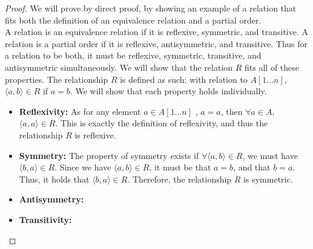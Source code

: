 \documentclass[titlepage]{article}
\begin{document}
\begin{proof}
We will prove by direct proof, by showing an example of a relation that fits both the definition of an equivalence relation and a partial order.
\\
A relation is an equivalence relation if it is reflexive, symmetric, and transitive. A relation is a partial order if it is reflexive, antisymmetric, and transitive. Thus for a relation to be both, it must be reflexive, symmetric, transitive, and antisymmetric simultaneously. We will show that the relation $R$ fits all of these properties. The relationship $R$ is defined as such: with relation to $A[1...n]$, $\langle a,b \rangle \in R$ if $a=b$. We will show that each property holds individually.
\begin{itemize}
\item \textbf{Reflexivity:} As for any element $a \in A[1...n]$ , $a=a$, then $\forall a \in A$, $\langle a,a \rangle \in R$. This is exactly the definition of reflexivity, and thus the relationship $R$ is reflexive.
\item \textbf{Symmetry:} The property of symmetry exists if $\forall \langle a,b \rangle \in R$, we must have $\langle b,a \rangle \in R$. Since we have $\langle a,b \rangle \in R$, it must be that $a=b$, and that $b=a$. Thus, it holds that $\langle b,a \rangle \in R$. Therefore, the relationship $R$ is symmetric. 
\item \textbf{Antisymmetry:}
\item \textbf{Transitivity:}
\end{itemize}
\end{proof} 
\end{document}
